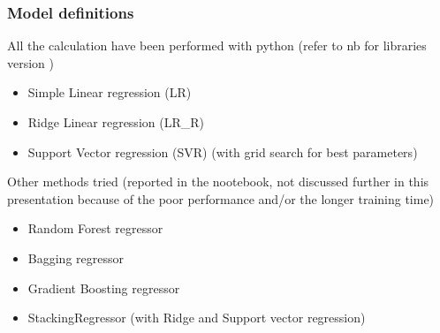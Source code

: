 \begin{frame}
    \frametitle{Model definitions}
    All the calculation have been performed with python (refer to nb for libraries version )
        \begin{itemize}
            \item Simple Linear regression (LR)
            \item Ridge Linear regression (LR\_R)
            \item Support Vector regression (SVR) (with grid search for best parameters)
        \end{itemize}
    Other methods tried (reported in the nootebook, not discussed further in this presentation because of the poor performance and/or the longer training time)
    \begin{itemize}
        \item Random Forest regressor
        \item Bagging regressor
        \item Gradient Boosting regressor
        \item StackingRegressor (with Ridge and Support vector regression)
    \end{itemize}
    \end{frame}
